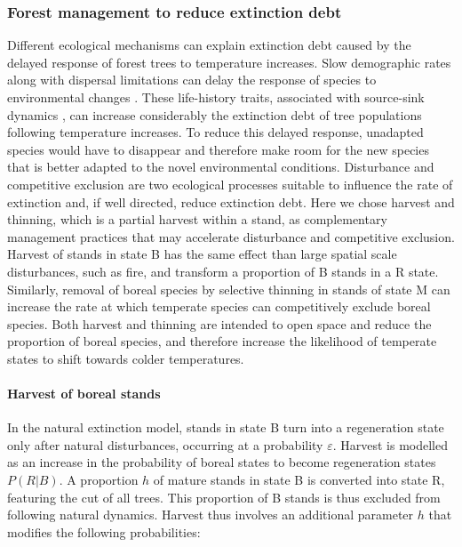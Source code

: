 \hypertarget{forest-management-to-reduce-extinction-debt}{%
\subsubsection{Forest management to reduce extinction
debt}\label{forest-management-to-reduce-extinction-debt}}

Different ecological mechanisms can explain extinction debt caused by
the delayed response of forest trees to temperature increases. Slow
demographic rates along with dispersal limitations can delay the
response of species to environmental changes \citep{Dullinger2012}.
These life-history traits, associated with source-sink dynamics
\citep{Schurr2012}, can increase considerably the extinction debt of
tree populations following temperature increases. To reduce this delayed
response, unadapted species would have to disappear and therefore make
room for the new species that is better adapted to the novel
environmental conditions. Disturbance and competitive exclusion are two
ecological processes suitable to influence the rate of extinction and,
if well directed, reduce extinction debt. Here we chose harvest and
thinning, which is a partial harvest within a stand, as complementary
management practices that may accelerate disturbance and competitive
exclusion. Harvest of stands in state B has the same effect than large
spatial scale disturbances, such as fire, and transform a proportion of
B stands in a R state. Similarly, removal of boreal species by selective
thinning in stands of state M can increase the rate at which temperate
species can competitively exclude boreal species. Both harvest and
thinning are intended to open space and reduce the proportion of boreal
species, and therefore increase the likelihood of temperate states to
shift towards colder temperatures.\\

\hypertarget{harvest-of-boreal-stands}{%
\paragraph{Harvest of boreal stands}\label{harvest-of-boreal-stands}}

In the natural extinction model, stands in state B turn into a
regeneration state only after natural disturbances, occurring at a
probability \(\varepsilon\). Harvest is modelled as an increase in the
probability of boreal states to become regeneration states \(P(R|B)\). A
proportion \(h\) of mature stands in state B is converted into state R,
featuring the cut of all trees. This proportion of B stands is thus
excluded from following natural dynamics. Harvest thus involves an
additional parameter \(h\) that modifies the following probabilities:\\

